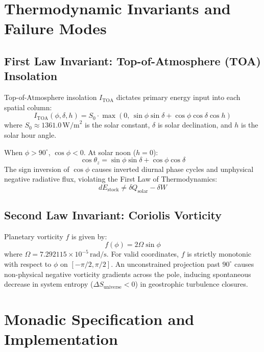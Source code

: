 \documentclass[11pt,a4paper]{article}
\begin{document}
\section{Thermodynamic Invariants and Failure Modes}

\subsection{First Law Invariant: Top-of-Atmosphere (TOA) Insolation}
Top-of-Atmosphere insolation $I_{\text{TOA}}$ dictates primary energy input into each spatial column:
\begin{equation}
I_{\text{TOA}}(\phi, \delta, h) = S_0 \cdot \max\left(0, \, \sin\phi\sin\delta + \cos\phi\cos\delta\cos h\right)
\end{equation}
where $S_0 \approx 1361.0 \, \text{W/m}^2$ is the solar constant, $\delta$ is solar declination, and $h$ is the solar hour angle.

When $\phi > 90^\circ$, $\cos\phi < 0$. At solar noon ($h=0$):
\begin{equation}
\cos\theta_z = \sin\phi\sin\delta + \cos\phi\cos\delta
\end{equation}
The sign inversion of $\cos\phi$ causes inverted diurnal phase cycles and unphysical negative radiative flux, violating the First Law of Thermodynamics:
\begin{equation}
dE_{\text{stock}} \neq \delta Q_{\text{solar}} - \delta W
\end{equation}

\subsection{Second Law Invariant: Coriolis Vorticity}
Planetary vorticity $f$ is given by:
\begin{equation}
f(\phi) = 2\Omega \sin\phi
\end{equation}
where $\Omega = 7.292115 \times 10^{-5} \, \text{rad/s}$. For valid coordinates, $f$ is strictly monotonic with respect to $\phi$ on $[-\pi/2, \pi/2]$. An unconstrained projection past $90^\circ$ causes non-physical negative vorticity gradients across the pole, inducing spontaneous decrease in system entropy ($\Delta S_{\text{universe}} < 0$) in geostrophic turbulence closures.

\section{Monadic Specification and Implementation}
\end{document}

